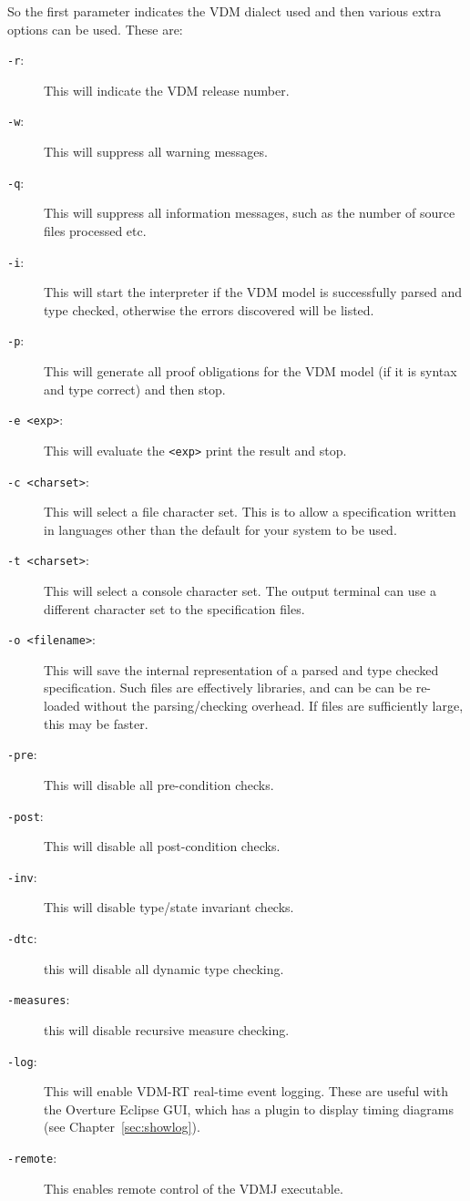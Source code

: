 \documentclass{overturerepchap}
\begin{document}
So the first parameter indicates the VDM dialect used and then
various extra options can be used. These are:

\begin{description}
\item[\texttt{-r}:] This will indicate the VDM release number.
\item[\texttt{-w}:] This will suppress all warning messages.
\item[\texttt{-q}:] This will suppress all information messages, such as
 the number of source files processed etc.
\item[\texttt{-i}:] This will start the interpreter if the VDM
  model is successfully parsed and type checked, otherwise the errors discovered
  will be listed.
\item[\texttt{-p}:] This will generate all proof obligations for the
  VDM model (if it is syntax and type correct) and then 
  stop.
\item[\texttt{-e <exp>}:] This will evaluate the \texttt{<exp>} print
  the result and stop.
\item[\texttt{-c <charset>}:] This will select a file character set. This is to
allow a specification written in languages other than the default for your system
to be used. 
\item[\texttt{-t <charset>}:] This will select a console character set. The output
terminal can use a different character set to the specification files.
\item[\texttt{-o <filename>}:] This will save the internal
  representation of a parsed and type checked spe\-ci\-fication. Such files are
effectively libraries, and can be can be re-loaded without the
parsing/checking overhead. If files are sufficiently large, this may be faster.
\item[\texttt{-pre}:] This will disable all pre-condition checks.
\item[\texttt{-post}:] This will disable all post-condition checks.
\item[\texttt{-inv}:] This will disable type/state invariant checks.
\item[\texttt{-dtc}:] this will disable all dynamic type checking.
\item[\texttt{-measures}:] this will disable recursive measure checking.
\item[\texttt{-log}:] This will enable VDM-RT real-time event logging. These
  are useful with the Overture Eclipse GUI, which has a plugin to
  display timing diagrams (see Chapter~\ref{sec:showlog}).
\item [\texttt{-remote}:] This enables remote control of the VDMJ executable.
\end{description}
\end{document}
